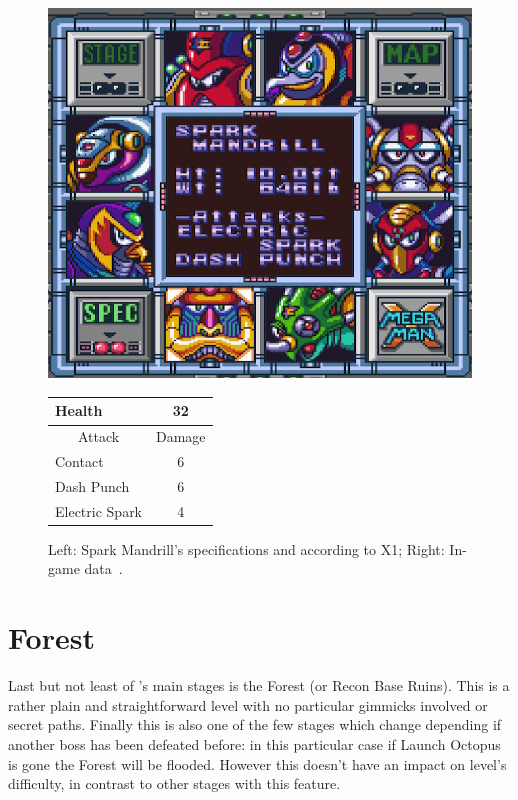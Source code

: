 \begin{figure}[htp]
	\begin{minipage}[c]{0.45\linewidth}
		\vspace{0pt}
		\centering
		\includegraphics[width=\linewidth]{figures/X1/Spark_mandrill/Spark_mandril_specs.png}
	\end{minipage}
	\begin{minipage}[c]{0.45\linewidth}
		\centering
		\vspace{0pt}
		\begin{tabular}[h]{l c}
			\toprule
			Health  & 32\\
			\midrule
			\multicolumn{1}{c}{Attack} & \multicolumn{1}{c}{Damage}\\
			Contact & 6\\
			Dash Punch& 6\\
			Electric Spark & 4\\
			\bottomrule
		\end{tabular}
	\end{minipage}
	\caption{Left: Spark Mandrill's specifications and according to X1; Right: In-game data~\cite{wiki:Spark_mandrill}. }
	\label{Mandrill_specs}
\end{figure}

\section{Forest}
Last but not least of \x's main stages is the Forest (or Recon Base Ruins). This is a rather plain and straightforward level with no particular gimmicks involved or secret paths. Finally this is also one of the few stages which change depending if another boss has been defeated before: in this particular case if Launch Octopus is gone the Forest will be flooded. However this doesn't have an impact on level's difficulty, in contrast to other stages with this feature.

